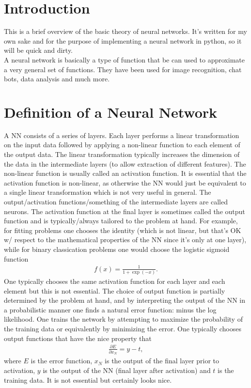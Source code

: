 \documentclass[12pt]{article}
\numberwithin{equation}{section}
\begin{document}
\section{Introduction}
This is a brief overview of the basic theory of neural networks. It's written for my own sake and for the purpose of implementing a neural network in python, so it will be quick and dirty. 
\\
A neural network is basically a type of function that be can used to approximate a very general set of functions. They have been used for image recognition, chat bots, data analysis and much more. 

\section{Definition of a Neural Network}
A NN consists of a series of layers. Each layer performs a linear transformation on the input data followed by applying a non-linear function to each element of the output data. The linear transformation typically increases the dimension of the data in the intermediate layers (to allow extraction of different features). The non-linear function is usually called an activation function. It is essential that the activation function is non-linear, as otherwise the NN would just be equivalent to a single linear transformation which is not very useful in general. The output/activation functions/something of the intermediate layers are called neurons. The activation function at the final layer is sometimes called the output function and is typically/always tailored to the problem at hand. For example, for fitting problems one chooses the identity (which is not linear, but that's OK w/ respect to the mathematical properties of the NN since it's only at one layer), while for binary classication problems one would choose the logistic sigmoid function
\begin{align}
f(x) = \frac{1}{1+\exp(-x)}.
\end{align}
One typically chooses the same activation function for each layer and each element but this is not essential.
The choice of output function is partially determined by the problem at hand, and by interpreting the output of the NN in a probabilistic manner one finds a natural error function: minus the log likelihood. One trains the network by attempting to maximize the probability of the training data or equivalently by minimizing the error. One typically chooses output functions that have the nice property that
\begin{align}
\frac{\partial E}{\partial x_N} = y-t,
\end{align}
where \(E\) is the error function, \(x_N\) is the output of the final layer prior to activation, \(y\) is the output of the NN (final layer after activation) and \(t\) is the training data. It is not essential but certainly looks nice.
\end{document}
